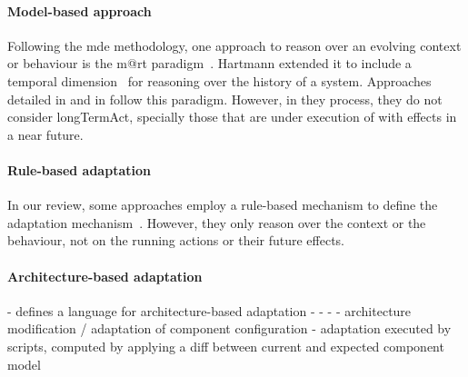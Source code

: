 \paragraph{Model-based approach}
Following the \gls{mde} methodology, one approach to reason over an evolving context or \gls{behaviour} is the \gls{m@rt} paradigm~\cite{DBLP:journals/computer/BlairBF09, DBLP:journals/computer/MorinBJFS09}.
Hartmann \etal extended it to include a temporal dimension~\cite{DBLP:conf/seke/0001FNMKT14, DBLP:conf/models/0001FNMKBT14} for reasoning over the history of a system.
Approaches detailed in \cite{DBLP:conf/icse/BarbosaLMJ17} and in \cite{DBLP:conf/icse/ChenPYNZ14} follow this paradigm.
However, in they process, they do not consider \gls{longTermAct}, specially those that are under execution of with effects in a near future.

\paragraph{Rule-based adaptation}
In our review, some approaches employ a rule-based mechanism to define the adaptation mechanism~\cite{DBLP:conf/icse/ArcainiRS15, DBLP:conf/icse/TaharaOH17, DBLP:conf/eurosys/GraceHPBCT08}.
However, they only reason over the context or the behaviour, not on the running actions or their future effects.

\paragraph{Architecture-based adaptation}
- \cite{DBLP:journals/jss/ChengG12} defines a language for architecture-based adaptation
- \cite{DBLP:journals/computer/GarlanCHSS04}
- \cite{DBLP:journals/computer/GeorgasHT09}
- \cite{DBLP:conf/cbse/FouquetMFBPJ12}
	- architecture modification / adaptation of component configuration
	- adaptation executed by scripts, computed by applying a diff between current and expected component model
	
